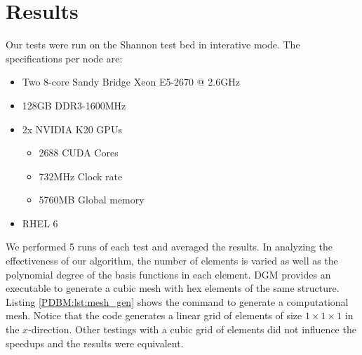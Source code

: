\documentclass{ccr16}
\begin{document}
    \section{Results}
    {
        \label{PDBM:sec:results}

        Our tests were run on the Shannon test bed in interative mode. The specifications per node are:

        \begin{itemize}
            \item Two 8-core Sandy Bridge Xeon E5-2670 @ 2.6GHz
            \item 128GB DDR3-1600MHz
            \item 2x NVIDIA K20 GPUs

            \begin{itemize}
                \item 2688 CUDA Cores
                \item 732MHz Clock rate
                \item 5760MB Global memory
            \end{itemize}

            \item RHEL 6
        \end{itemize}

        We performed 5 runs of each test and averaged the results. In analyzing the effectiveness of our algorithm, the number of elements is varied as well as the polynomial degree of the basis functions in each element. DGM provides an executable to generate a cubic mesh with hex elements of the same structure. Listing \ref{PDBM:lst:mesh_gen} shows the command to generate a computational mesh. Notice that the code generates a linear grid of elements of size $1 \times 1 \times 1$ in the $x$-direction. Other testings with a cubic grid of elements did not influence the speedups and the results were equivalent.

        

}
\end{document}
